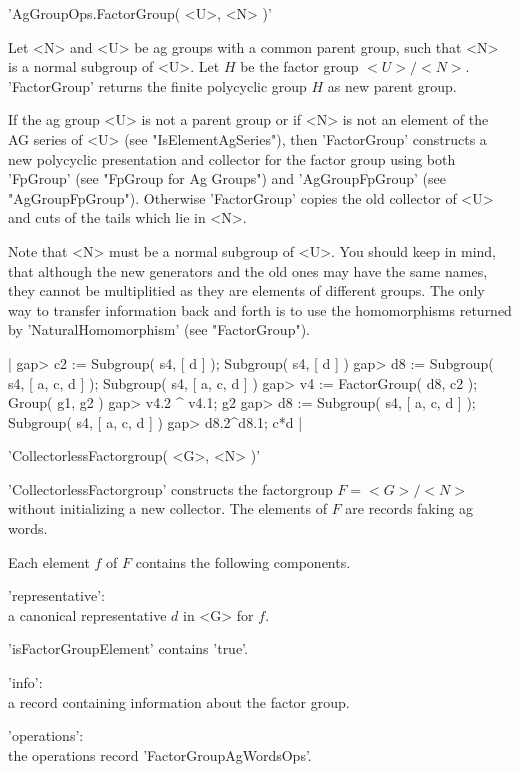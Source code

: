 'AgGroupOps.FactorGroup( <U>, <N> )'

Let <N> and <U> be ag groups with a common parent group, such that <N> is
a  normal subgroup  of <U>.  Let  $H$  be the factor group   $<U> / <N>$.
'FactorGroup'   returns the finite   polycyclic group $H$ as  new  parent
group.

If the ag group <U> is not a parent group or if <N> is not  an element of
the   AG series of <U>   (see   "IsElementAgSeries"),  then 'FactorGroup'
constructs a  new polycyclic  presentation and collector  for the  factor
group   using  both  'FpGroup'    (see "FpGroup   for   Ag  Groups")  and
'AgGroupFpGroup' (see "AgGroupFpGroup").   Otherwise 'FactorGroup' copies
the old collector of <U> and cuts of the tails which lie in <N>.

Note that <N> must be a normal subgroup of <U>.  You should keep in mind,
that although  the new generators  and the  old ones  may  have the  same
names,  they  cannot be  multiplitied as they are  elements  of different
groups.  The only  way to transfer  information back and  forth is to use
the       homomorphisms   returned    by   'NaturalHomomorphism'     (see
"FactorGroup").

|    gap> c2 := Subgroup( s4, [ d ] );
    Subgroup( s4, [ d ] )
    gap> d8 := Subgroup( s4, [ a, c, d ] );
    Subgroup( s4, [ a, c, d ] )
    gap> v4 := FactorGroup( d8, c2 );
    Group( g1, g2 )
    gap> v4.2 ^ v4.1;
    g2
    gap> d8 := Subgroup( s4, [ a, c, d ] );
    Subgroup( s4, [ a, c, d ] )
    gap> d8.2^d8.1;
    c*d |


'CollectorlessFactorgroup( <G>, <N> )'

'CollectorlessFactorgroup'   constructs the  factorgroup   $F  = <G>/<N>$
without initializing a  new collector.  The  elements  of $F$ are records
faking ag words.

Each element $f$ of $F$ contains the following components.

'representative': \\
        a canonical representative $d$ in <G> for $f$.

'isFactorGroupElement'
        contains 'true'.

'info': \\
        a record containing information about the factor group.

'operations': \\
        the operations record 'FactorGroupAgWordsOps'.


